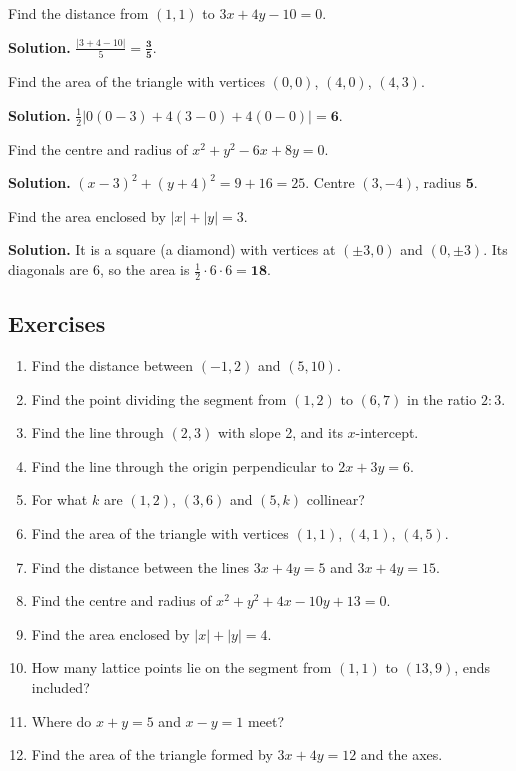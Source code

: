 \documentclass[11pt,a4paper,openany]{report}
\newenvironment{exercises}{\subsection*{Exercises \thechapter}\begin{enumerate}[label=\textbf{\thechapter.\arabic*},leftmargin=3.2em]}{\end{enumerate}}
\begin{document}
\begin{example}
Find the distance from $(1,1)$ to $3x+4y-10=0$.

\textbf{Solution.} $\frac{|3+4-10|}{5}=\mathbf{\frac35}$.
\end{example}

\begin{example}[shoelace]
Find the area of the triangle with vertices $(0,0)$, $(4,0)$, $(4,3)$.

\textbf{Solution.} $\frac12|0(0-3)+4(3-0)+4(0-0)|=\mathbf{6}$.
\end{example}

\begin{example}
Find the centre and radius of $x^2+y^2-6x+8y=0$.

\textbf{Solution.} $(x-3)^2+(y+4)^2=9+16=25$. Centre $(3,-4)$, radius $\mathbf{5}$.
\end{example}

\begin{example}
Find the area enclosed by $|x|+|y|=3$.

\textbf{Solution.} It is a square (a diamond) with vertices at $(\pm3,0)$ and $(0,\pm3)$. Its diagonals are 6, so the area is $\frac12\cdot6\cdot6=\mathbf{18}$.
\end{example}

\begin{exercises}
\item Find the distance between $(-1,2)$ and $(5,10)$.
\item Find the point dividing the segment from $(1,2)$ to $(6,7)$ in the ratio $2:3$.
\item Find the line through $(2,3)$ with slope 2, and its $x$-intercept.
\item Find the line through the origin perpendicular to $2x+3y=6$.
\item For what $k$ are $(1,2)$, $(3,6)$ and $(5,k)$ collinear?
\item Find the area of the triangle with vertices $(1,1)$, $(4,1)$, $(4,5)$.
\item Find the distance between the lines $3x+4y=5$ and $3x+4y=15$.
\item Find the centre and radius of $x^2+y^2+4x-10y+13=0$.
\item Find the area enclosed by $|x|+|y|=4$.
\item How many lattice points lie on the segment from $(1,1)$ to $(13,9)$, ends included?
\item Where do $x+y=5$ and $x-y=1$ meet?
\item Find the area of the triangle formed by $3x+4y=12$ and the axes.
\end{exercises}
\end{document}
